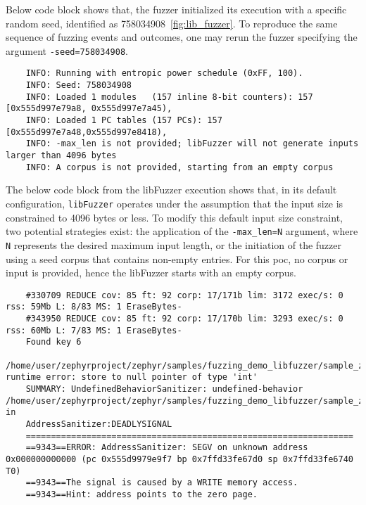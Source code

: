 Below code block shows that, the fuzzer initialized its execution with a specific random seed,
identified as 758034908~\ref{fig:lib_fuzzer}. To reproduce the same
sequence of fuzzing events and outcomes, one may rerun the fuzzer
specifying the argument \texttt{-seed=758034908}.

\begin{verbatim}
    INFO: Running with entropic power schedule (0xFF, 100).
    INFO: Seed: 758034908
    INFO: Loaded 1 modules   (157 inline 8-bit counters): 157 [0x555d997e79a8, 0x555d997e7a45),
    INFO: Loaded 1 PC tables (157 PCs): 157 [0x555d997e7a48,0x555d997e8418),
    INFO: -max_len is not provided; libFuzzer will not generate inputs larger than 4096 bytes
    INFO: A corpus is not provided, starting from an empty corpus
\end{verbatim}

The below code block from the libFuzzer execution shows that,
in its default configuration, \texttt{libFuzzer} operates under
the assumption that the input size is constrained to 4096 bytes or less.
To modify this default input size constraint, two potential strategies exist:
the application of the \texttt{-max\_len=N} argument, where \texttt{N} represents
the desired maximum input length, or the initiation of the fuzzer using a
seed corpus that contains non-empty entries. For this \acrlong{poc},
no corpus or input is provided, hence the libFuzzer starts with an empty corpus.

\begin{verbatim}
    #330709 REDUCE cov: 85 ft: 92 corp: 17/171b lim: 3172 exec/s: 0 rss: 59Mb L: 8/83 MS: 1 EraseBytes-
    #343950 REDUCE cov: 85 ft: 92 corp: 17/170b lim: 3293 exec/s: 0 rss: 60Mb L: 7/83 MS: 1 EraseBytes-
    Found key 6
    /home/user/zephyrproject/zephyr/samples/fuzzing_demo_libfuzzer/sample_zephyr_libfuzzer/src/main.c:52:1: runtime error: store to null pointer of type 'int'
    SUMMARY: UndefinedBehaviorSanitizer: undefined-behavior /home/user/zephyrproject/zephyr/samples/fuzzing_demo_libfuzzer/sample_zephyr_libfuzzer/src/main.c:52:1 in
    AddressSanitizer:DEADLYSIGNAL
    =================================================================
    ==9343==ERROR: AddressSanitizer: SEGV on unknown address 0x000000000000 (pc 0x555d9979e9f7 bp 0x7ffd33fe67d0 sp 0x7ffd33fe6740 T0)
    ==9343==The signal is caused by a WRITE memory access.
    ==9343==Hint: address points to the zero page.
\end{verbatim}

